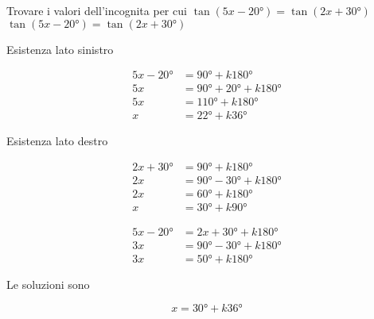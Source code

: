 \begin{exercise}
	Trovare i valori dell'incognita per cui $\tan(5x-\ang{20;;} )=\tan(2x+\ang{30;;})$
	\tcblower
	$\tan(5x-\ang{20;;} )=\tan(2x+\ang{30;;})$
	
	Esistenza lato sinistro
	
		\begin{align*}
		5x-\ang{20;;}&=\ang{90;;}+k\ang{180;;}\\
		5x&=\ang{90;;}+\ang{20;;}+k\ang{180;;}\\
		5x&=\ang{110;;}+k\ang{180;;}\\
	     x&=\ang{22;;}+k\ang{36;;}
		\end{align*}
	
	Esistenza lato destro
	
	\begin{align*}
	2x+\ang{30;;}&=\ang{90;;}+k\ang{180;;}\\
	2x&=\ang{90;;}-\ang{30;;}+k\ang{180;;}\\
	2x&=\ang{60;;}+k\ang{180;;}\\
	x&=\ang{30;;}+k\ang{90;;}
	\end{align*}
	
	
	\begin{align*}
	5x-\ang{20;;}&=2x+\ang{30;;}+k\ang{180;;}\\
	3x&=\ang{90;;}-\ang{30;;}+k\ang{180;;}\\
	3x&=\ang{50;;}+k\ang{180;;}
	\end{align*}
	
	Le soluzioni sono
	
\[x =\ang{30;;}+k\ang{36;;}\]
\end{exercise}
